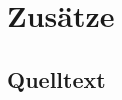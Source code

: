 
\chapter{Zusätze}
\label{chapter:anhang}

\printglossary[type=\acronymtype,title=Abkürzungen]


\section{Quelltext}
\label{section:quelltext}


